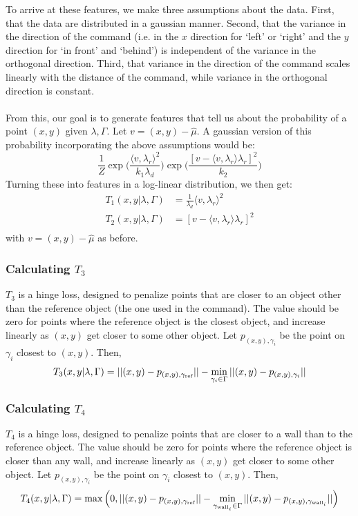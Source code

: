 \documentclass[12pt,letterpaper]{article}
\newcommand\refobj{\textmd{ref}}
\begin{document}
To arrive at these features, we make three assumptions about the data. First, that the data are distributed in a gaussian manner. Second, that the variance in the direction of the command (i.e. in the $x$ direction for `left' or `right' and the $y$ direction for `in front' and `behind') is independent of the variance in the orthogonal direction. Third, that variance in the direction of the command scales linearly with the distance of the command, while variance in the orthogonal direction is constant. \\
\\
From this, our goal is to generate features that tell us about the probability of a point $(x, y)$ given $\lambda, \Gamma$. Let $v = (x, y) - \hat{\mu}$. A gaussian version of this probability incorporating the above assumptions would be:
\[
\frac{1}{Z}\exp\bigg(\frac{\langle v, \lambda_r\rangle^2}{k_1 \lambda_d}\bigg)\exp\bigg(\frac{[v - \langle v, \lambda_r\rangle\lambda_r]^2}{k_2}\bigg)
\]
Turning these into features in a log-linear distribution, we then get:
\begin{equation*}
\begin{split}
T_1(x, y | \lambda, \Gamma) &= \frac{1}{\lambda_d} \langle v, \lambda_r \rangle^2 \\
T_2(x, y | \lambda, \Gamma) &= [v - \langle v, \lambda_r \rangle\lambda_r]^2 \\
\end{split}
\end{equation*}
with $v = (x, y) - \hat{\mu}$ as before.

\subsubsection{Calculating $T_3$}
$T_3$ is a hinge loss, designed to penalize points that are closer to an object other than the reference object (the one used in the command). The value should be zero for points where the reference object is the closest object, and increase linearly as $(x, y)$ get closer to some other object. Let $p_{(x, y), \gamma_i}$ be the point on $\gamma_i$ closest to $(x, y)$. Then,
\[
T_3(x, y|\lambda, \Gamma) = ||(x, y) - p_{(x, y), \gamma_{\refobj}}|| - \min_{\gamma_i \in \Gamma} ||(x, y) - p_{(x, y), \gamma_i}||
\]

\subsubsection{Calculating $T_4$}
$T_4$ is a hinge loss, designed to penalize points that are closer to a wall than to the reference object. The value should be zero for points where the reference object is closer than any wall, and increase linearly as $(x, y)$ get closer to some other object. Let $p_{(x, y), \gamma_i}$ be the point on $\gamma_i$ closest to $(x, y)$. Then,
\[
T_4(x, y|\lambda, \Gamma) = \max\Big(0, ||(x, y) - p_{(x, y), \gamma_{\refobj}}|| - \min_{\gamma_{\textmd{wall}_i} \in \Gamma} ||(x, y) - p_{(x, y), \gamma_{\textmd{wall}_i}}||\Big)
\]
\end{document}
